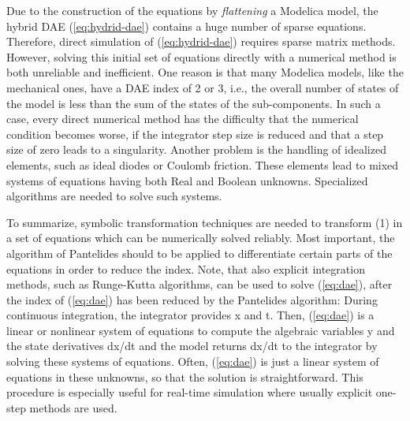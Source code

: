 Due to the construction of the equations by \emph{flattening} a Modelica
model, the hybrid DAE (\ref{eq:hydrid-dae}) contains a huge number of sparse equations.
Therefore, direct simulation of (\ref{eq:hydrid-dae}) requires sparse matrix methods.
However, solving this initial set of equations directly with a numerical
method is both unreliable and inefficient. One reason is that many
Modelica models, like the mechanical ones, have a DAE index of 2 or 3,
i.e., the overall number of states of the model is less than the sum of
the states of the sub-components. In such a case, every direct numerical
method has the difficulty that the numerical condition becomes worse, if
the integrator step size is reduced and that a step size of zero leads
to a singularity. Another problem is the handling of idealized elements,
such as ideal diodes or Coulomb friction. These elements lead to mixed
systems of equations having both Real and Boolean unknowns. Specialized
algorithms are needed to solve such systems.

To summarize, symbolic transformation techniques are needed to transform
(1) in a set of equations which can be numerically solved reliably. Most
important, the algorithm of Pantelides should to be applied to
differentiate certain parts of the equations in order to reduce the
index. Note, that also explicit integration methods, such as Runge-Kutta
algorithms, can be used to solve (\ref{eq:dae}), after the index of (\ref{eq:dae}) has been
reduced by the Pantelides algorithm: During continuous integration, the
integrator provides x and t. Then, (\ref{eq:dae}) is a linear or nonlinear system
of equations to compute the algebraic variables y and the state
derivatives dx/dt and the model returns dx/dt to the integrator by
solving these systems of equations. Often, (\ref{eq:dae}) is just a linear system
of equations in these unknowns, so that the solution is straightforward.
This procedure is especially useful for real-time simulation where
usually explicit one-step methods are used.
